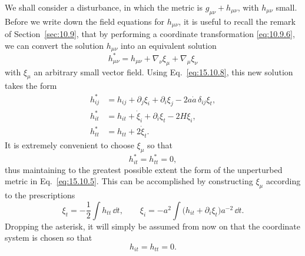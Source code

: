 We shall consider a disturbance, in which the metric is
\(g_{\mu\nu}+h_{\mu\nu}\), with \(h_{\mu\nu}\) small. Before we write down
the field equations for \(h_{\mu\nu}\), it is useful to recall the remark of
Section~\ref{sec:10.9}, that by performing a coordinate transformation
\eqref{eq:10.9.6}, we can convert the solution \(h_{\mu\nu}\) into an
equivalent solution
\[
  h_{\mu\nu}^*
  =
  h_{\mu\nu}+\nabla_\nu\xi_\mu+\nabla_\mu\xi_\nu
\]
with \(\xi_\mu\) an arbitrary small vector field. Using
Eq.~\eqref{eq:15.10.8}, this new solution takes the form
\begin{align}
  h_{ij}^*
  &=
  h_{ij}
  +\partial_j\xi_i+\partial_i\xi_j
  -2a\dot a\,\delta_{ij}\xi_t,
  \tag{15.10.9}\label{eq:15.10.9}\\
  h_{it}^*
  &=
  h_{it}
  +\dot\xi_i+\partial_i\xi_t-2H\xi_i,
  \tag{15.10.10}\label{eq:15.10.10}\\
  h_{tt}^*
  &=
  h_{tt}+2\dot\xi_t.
  \tag{15.10.11}\label{eq:15.10.11}
\end{align}
It is extremely convenient to choose \(\xi_\mu\) so that
\[
  h_{it}^*=h_{tt}^*=0,
\]
thus maintaining to the greatest possible extent the form of the unperturbed
metric in Eq.~\eqref{eq:15.10.5}. This can be accomplished by constructing
\(\xi_\mu\) according to the prescriptions
\[
  \xi_t=-\frac12\int h_{tt}\,\dd t,
  \qquad
  \xi_i
  =
  -a^2\int
  \bigl(h_{it}+\partial_i\xi_t\bigr)a^{-2}\,\dd t.
\]
Dropping the asterisk, it will simply be assumed from now on that the
coordinate system is chosen so that
\begin{equation}
  h_{it}=h_{tt}=0.
  \tag{15.10.12}\label{eq:15.10.12}
\end{equation}

